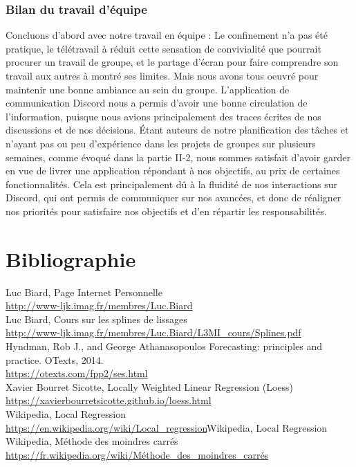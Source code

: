 \documentclass[a4paper,12pt]{article} %
\begin{document}
	\section{Bilan du travail d'équipe}
	Concluons d'abord avec notre travail en équipe :
	Le confinement n'a pas été pratique, le télétravail à réduit cette sensation de convivialité que pourrait procurer un travail de groupe, et le partage d'écran pour faire comprendre son travail aux autres à montré ses limites. Mais nous avons tous oeuvré pour maintenir une bonne ambiance au sein du groupe. 
	L'application de communication Discord nous a permis d'avoir une bonne circulation de l'information, puisque nous avions principalement des traces écrites de nos discussions et de nos décisions. 
    Étant auteurs de notre planification des tâches et n'ayant pas ou peu d'expérience dans les projets de groupes sur plusieurs semaines, comme évoqué dans la partie II-2, nous sommes satisfait d'avoir garder en vue de livrer une application répondant à nos objectifs, au prix de certaines fonctionnalités. Cela est  principalement dû à la fluidité de nos interactions sur Discord, qui ont permis de communiquer sur nos avancées, et donc de réaligner nos priorités pour satisfaire nos objectifs et d'en répartir les responsabilités. 

	




\renewcommand\partname{}
\part{Bibliographie}

Luc Biard, Page Internet Personnelle\\
\url{http://www-ljk.imag.fr/membres/Luc.Biard}\\
Luc Biard, Cours sur les splines de lissages\\
\url{http://www-ljk.imag.fr/membres/Luc.Biard/L3MI_cours/Splines.pdf}\\
Hyndman, Rob J., and George Athanasopoulos   Forecasting: principles and practice. OTexts, 2014.\\
\url{https://otexts.com/fpp2/ses.html}\\
Xavier Bourret Sicotte, Locally Weighted Linear Regression (Loess)\\
\url{https://xavierbourretsicotte.github.io/loess.html}\\
Wikipedia, Local Regression\\
\url{https://en.wikipedia.org/wiki/Local_regression}{Wikipedia, Local Regression}\\
Wikipedia, Méthode des moindres carrés\\
\url{https://fr.wikipedia.org/wiki/Méthode_des_moindres_carrés}\\
\end{document}
